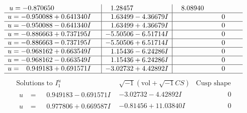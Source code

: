 \documentclass[1p]{elsarticle_modified}
\theoremstyle{definition}
\newcommand{\I}{\sqrt{-1}}
\begin{document}
$$\begin{array}{c|c|c}
\begin{aligned}
u &= -0.870650\phantom{ +0.000000I}\end{aligned}
 & \phantom{-}1.28457\phantom{ +0.000000I} & \phantom{-}8.08940\phantom{ +0.000000I} \\ \hline\begin{aligned}
u &= -0.950088 + 0.641340 I\end{aligned}
 & \phantom{-}1.63499 - 4.36679 I & \phantom{-0.000000 } 0 \\ \hline\begin{aligned}
u &= -0.950088 - 0.641340 I\end{aligned}
 & \phantom{-}1.63499 + 4.36679 I & \phantom{-0.000000 } 0 \\ \hline\begin{aligned}
u &= -0.886663 + 0.737195 I\end{aligned}
 & -5.50506 - 6.51714 I & \phantom{-0.000000 } 0 \\ \hline\begin{aligned}
u &= -0.886663 - 0.737195 I\end{aligned}
 & -5.50506 + 6.51714 I & \phantom{-0.000000 } 0 \\ \hline\begin{aligned}
u &= -0.968162 + 0.663549 I\end{aligned}
 & \phantom{-}1.15436 - 6.24286 I & \phantom{-0.000000 } 0 \\ \hline\begin{aligned}
u &= -0.968162 - 0.663549 I\end{aligned}
 & \phantom{-}1.15436 + 6.24286 I & \phantom{-0.000000 } 0 \\ \hline\begin{aligned}
u &= \phantom{-}0.949183 + 0.691571 I\end{aligned}
 & -3.02732 + 4.42892 I & \phantom{-0.000000 } 0\\
 \hline 
 \end{array}$$\newpage$$\begin{array}{c|c|c}  
\text{Solutions to }I^u_{1}& \I (\text{vol} + \sqrt{-1}CS) & \text{Cusp shape}\\
 \hline 
\begin{aligned}
u &= \phantom{-}0.949183 - 0.691571 I\end{aligned}
 & -3.02732 - 4.42892 I & \phantom{-0.000000 } 0 \\ \hline\begin{aligned}
u &= \phantom{-}0.977806 + 0.669587 I\end{aligned}
 & -0.81456 + 11.03840 I & \phantom{-0.000000 } 0 \\ \hline\begin{aligned}

\end{aligned}
\end{array}$$
\end{document}
